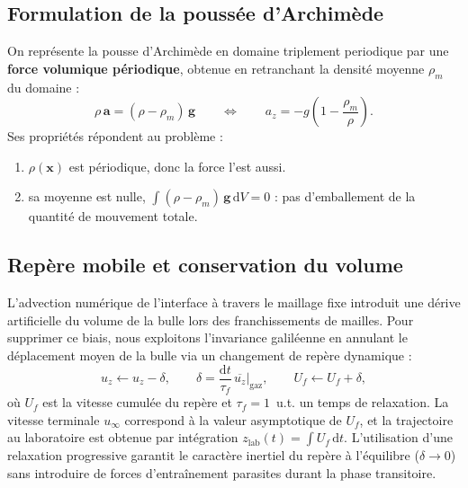 \subsection{Formulation de la poussée d’Archimède}

On représente la pousse d’Archimède en domaine triplement periodique par une \textbf{force volumique
périodique}, obtenue en retranchant la densité moyenne $\rho_m$ du domaine :
\begin{equation}
    \rho\,\mathbf{a} = (\rho - \rho_m)\,\mathbf{g}
    \qquad\Longleftrightarrow\qquad
    a_z = -g\left(1 - \frac{\rho_m}{\rho}\right).
    \label{eq:fix}
\end{equation}
Ses propriétés répondent au problème :
\begin{enumerate}
    \item $\rho(\mathbf{x})$ est périodique, donc la force l'est aussi.
    \item sa moyenne est nulle, $\int(\rho-\rho_m)\,\mathbf{g}\,\mathrm{d}V = 0$ :
    pas d'emballement de la quantité de mouvement totale.
\end{enumerate}

\subsection{Repère mobile et conservation du volume}

L'advection numérique de l'interface à travers le maillage fixe introduit une dérive artificielle du volume de la bulle lors des franchissements de mailles. Pour supprimer ce biais, nous exploitons l'invariance galiléenne en annulant le déplacement moyen de la bulle via un changement de repère dynamique :
\begin{equation}
    u_z \leftarrow u_z - \delta, \qquad
    \delta = \frac{\mathrm{d}t}{\tau_f}\,\overline{u_z}\big|_{\text{gaz}},
    \qquad U_f \leftarrow U_f + \delta,
    \label{eq:frame}
\end{equation}
où $U_f$ est la vitesse cumulée du repère et $\tau_f = 1$~u.t. un temps de relaxation. La vitesse terminale $u_\infty$ correspond à la valeur asymptotique de $U_f$, et la trajectoire au laboratoire est obtenue par intégration $z_{\text{lab}}(t) = \int U_f\,\mathrm{d}t$. L'utilisation d'une relaxation progressive garantit le caractère inertiel du repère à l'équilibre ($\delta \to 0$) sans introduire de forces d'entraînement parasites durant la phase transitoire.

